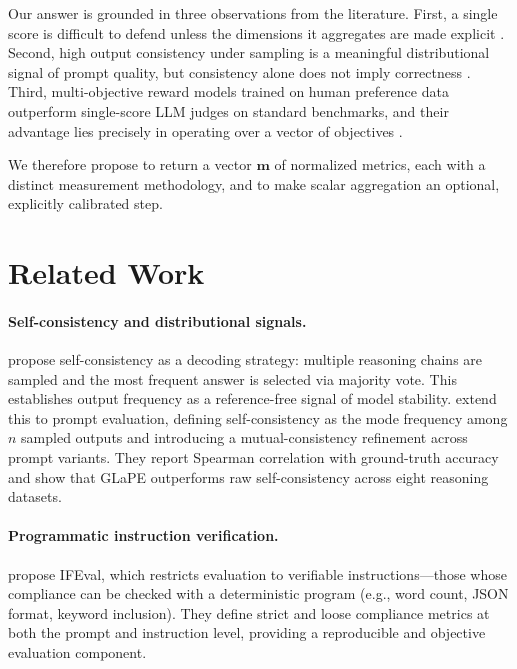 \documentclass[11pt,a4paper]{article}
\begin{document}
Our answer is grounded in three observations from the literature. First, a single score is difficult to defend unless the dimensions it aggregates are made explicit \citep{unieval2022}. Second, high output consistency under sampling is a meaningful distributional signal of prompt quality, but consistency alone does not imply correctness \citep{selfconsistency2023, glape2024}. Third, multi-objective reward models trained on human preference data outperform single-score LLM judges on standard benchmarks, and their advantage lies precisely in operating over a vector of objectives \citep{armorm2024}.

We therefore propose to return a vector $\mathbf{m}$ of normalized metrics, each with a distinct measurement methodology, and to make scalar aggregation an optional, explicitly calibrated step.

\section{Related Work}

\paragraph{Self-consistency and distributional signals.}
\citet{selfconsistency2023} propose self-consistency as a decoding strategy: multiple reasoning chains are sampled and the most frequent answer is selected via majority vote. This establishes output frequency as a reference-free signal of model stability. \citet{glape2024} extend this to prompt evaluation, defining self-consistency as the mode frequency among $n$ sampled outputs and introducing a mutual-consistency refinement across prompt variants. They report Spearman correlation with ground-truth accuracy and show that GLaPE outperforms raw self-consistency across eight reasoning datasets.

\paragraph{Programmatic instruction verification.}
\citet{ifeval2023} propose IFEval, which restricts evaluation to verifiable instructions—those whose compliance can be checked with a deterministic program (e.g., word count, JSON format, keyword inclusion). They define strict and loose compliance metrics at both the prompt and instruction level, providing a reproducible and objective evaluation component.
\end{document}
